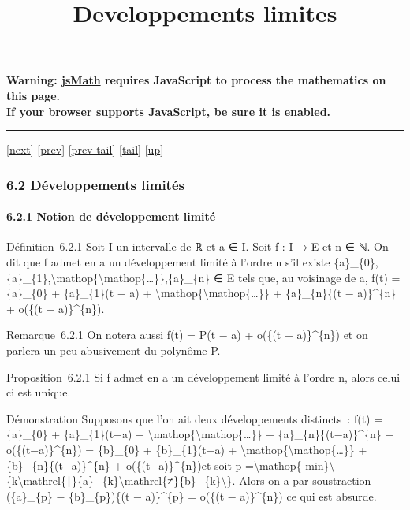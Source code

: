 \documentclass[]{article}
\title{Developpements limites}
\author{}
\date{}
\begin{document}
\maketitle

\textbf{Warning: \href{http://www.math.union.edu/locate/jsMath}{jsMath}
requires JavaScript to process the mathematics on this page.\\ If your
browser supports JavaScript, be sure it is enabled.}

\begin{center}\rule{3in}{0.4pt}\end{center}

{[}\href{coursse34.html}{next}{]} {[}\href{coursse32.html}{prev}{]}
{[}\href{coursse32.html\#tailcoursse32.html}{prev-tail}{]}
{[}\hyperref[tailcoursse33.html]{tail}{]}
{[}\href{coursch7.html\#coursse33.html}{up}{]}

\subsubsection{6.2 Développements limités}

\paragraph{6.2.1 Notion de développement limité}

Définition~6.2.1 Soit I un intervalle de ℝ et a ∈ I. Soit f : I → E et n
∈ ℕ. On dit que f admet en a un développement limité à l'ordre n s'il
existe
\{a\}\_\{0\},\{a\}\_\{1\},\textbackslash{}mathop\{\textbackslash{}mathop\{\ldots{}\}\},\{a\}\_\{n\}
∈ E tels que, au voisinage de a, f(t) = \{a\}\_\{0\} + \{a\}\_\{1\}(t −
a) + \textbackslash{}mathop\{\textbackslash{}mathop\{\ldots{}\}\} +
\{a\}\_\{n\}\{(t − a)\}\^{}\{n\} + o(\{(t − a)\}\^{}\{n\}).

Remarque~6.2.1 On notera aussi f(t) = P(t − a) + o(\{(t − a)\}\^{}\{n\})
et on parlera un peu abusivement du polynôme P.

Proposition~6.2.1 Si f admet en a un développement limité à l'ordre n,
alors celui ci est unique.

Démonstration Supposons que l'on ait deux développements distincts~:
f(t) = \{a\}\_\{0\} + \{a\}\_\{1\}(t−a) +
\textbackslash{}mathop\{\textbackslash{}mathop\{\ldots{}\}\} +
\{a\}\_\{n\}\{(t−a)\}\^{}\{n\} + o(\{(t−a)\}\^{}\{n\}) = \{b\}\_\{0\} +
\{b\}\_\{1\}(t−a) +
\textbackslash{}mathop\{\textbackslash{}mathop\{\ldots{}\}\} +
\{b\}\_\{n\}\{(t−a)\}\^{}\{n\} + o(\{(t−a)\}\^{}\{n\})et soit p
=\textbackslash{}mathop\{
min\}\textbackslash{}\{k\textbackslash{}mathrel\{∣\}\{a\}\_\{k\}\textbackslash{}mathrel\{≠\}\{b\}\_\{k\}\textbackslash{}\}.
Alors on a par soustraction (\{a\}\_\{p\} − \{b\}\_\{p\})\{(t −
a)\}\^{}\{p\} = o(\{(t − a)\}\^{}\{n\}) ce qui est absurde.
\end{document}
